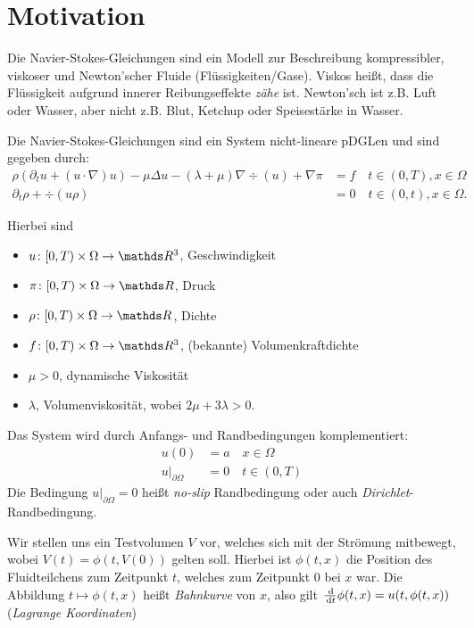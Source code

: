 \setcounter{chapter}{-1}
\chapter{Motivation}

Die Navier-Stokes-Gleichungen sind ein Modell zur Beschreibung kompressibler, viskoser und Newton'scher Fluide (Flüssigkeiten/Gase).
Viskos heißt, dass die Flüssigkeit aufgrund innerer Reibungseffekte \emph{zähe} ist.
Newton'sch ist z.B. Luft oder Wasser, aber nicht z.B. Blut, Ketchup oder Speisestärke in Wasser.

Die Navier-Stokes-Gleichungen sind ein System nicht-lineare pDGLen und sind gegeben durch:
\begin{align*}
  \rho(\partial_t u + (u \cdot \nabla)u) - \mu \Delta u - (\lambda + \mu) \nabla \div(u) + \nabla \pi &= f \quad t \in (0,T), x \in \Omega \\
  \partial_t \rho + \div(u\rho) &= 0 \quad t \in (0,t), x \in \Omega.
\end{align*}

Hierbei sind
\begin{itemize}
  \item $u \colon [0,T) \times \Omega \to \R^3$, Geschwindigkeit
  \item $\pi \colon [0,T) \times \Omega \to \R$, Druck
  \item $\rho \colon [0,T) \times \Omega \to \R$, Dichte
  \item $f \colon [0,T) \times \Omega \to \R^3$, (bekannte) Volumenkraftdichte
  \item $\mu > 0$, dynamische Viskosität
  \item $\lambda$, Volumenviskosität, wobei $2\mu + 3\lambda > 0$.
\end{itemize}

Das System wird durch Anfangs- und Randbedingungen komplementiert:
\begin{align*}
  u(0) &= a \quad x \in \Omega \\
  u|_{\partial\Omega} &= 0 \quad t \in (0,T)
\end{align*}
Die Bedingung $u|_{\partial\Omega} = 0$ heißt \emph{no-slip} Randbedingung oder auch \emph{Dirichlet}-Randbedingung.

Wir stellen uns ein Testvolumen $V$ vor, welches sich mit der Strömung mitbewegt, wobei $V(t) = \phi(t, V(0))$ gelten soll. Hierbei ist $\phi(t,x)$ die Position des Fluidteilchens zum Zeitpunkt $t$, welches zum Zeitpunkt $0$ bei $x$ war.
Die Abbildung $t \mapsto \phi(t,x)$ heißt \emph{Bahnkurve} von $x$, also gilt $\frac{\, {\operatorname{d}\!{}}}{\, {\operatorname{d}\!{t}}} \phi(t,x) = u(t, \phi(t,x))$ (\emph{Lagrange Koordinaten})

